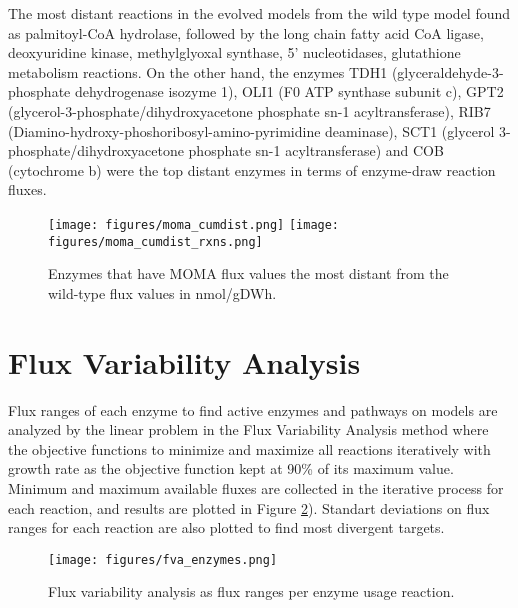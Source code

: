  The most distant reactions in the evolved models from the wild type model found as palmitoyl-CoA hydrolase, followed by the long chain fatty acid CoA ligase, deoxyuridine kinase, methylglyoxal synthase, 5' nucleotidases, glutathione metabolism reactions. On the other hand, the enzymes TDH1 (glyceraldehyde-3-phosphate dehydrogenase isozyme 1), OLI1 (F0 ATP synthase subunit c), GPT2 (glycerol-3-phosphate/dihydroxyacetone phosphate sn-1 acyltransferase), RIB7 (Diamino-hydroxy-phoshoribosyl-amino-pyrimidine deaminase), SCT1 (glycerol 3-phosphate/dihydroxyacetone phosphate sn-1 acyltransferase) and COB (cytochrome b) were the top distant enzymes in terms of enzyme-draw reaction fluxes.

\begin{figure}[H]
  \begin{center}
  \texttt{[image: figures/moma\_cumdist.png]}
  \texttt{[image: figures/moma\_cumdist\_rxns.png]}
  \caption[Enzymes that have MOMA flux values the most distant from the wild-type flux values in nmol/gDWh]{Enzymes that have MOMA flux values the most distant from the wild-type flux values in nmol/gDWh.}
  \label{fig:moma_cumdist}
  \end{center}
\end{figure}


\section{Flux Variability Analysis}
Flux ranges of each enzyme to find active enzymes and pathways on models are analyzed by the linear problem in the Flux Variability Analysis method where the objective functions to minimize and maximize all reactions iteratively with growth rate as the objective function kept at 90\% of its maximum value. Minimum and maximum available fluxes are collected in the iterative process for each reaction, and results are plotted in Figure \ref{fig:fva_enzymes}). Standart deviations on flux ranges for each reaction are also plotted to find most divergent targets.

\begin{figure}[H]
  \begin{center}
  \texttt{[image: figures/fva\_enzymes.png]}
  \caption[Flux variability analysis results as flux ranges per enzyme usage reaction, sorted by the wild-type flux ranges]{Flux variability analysis as flux ranges per enzyme usage reaction.}
  \end{center}
  \label{fig:fva_enzymes}
  \end{figure}

